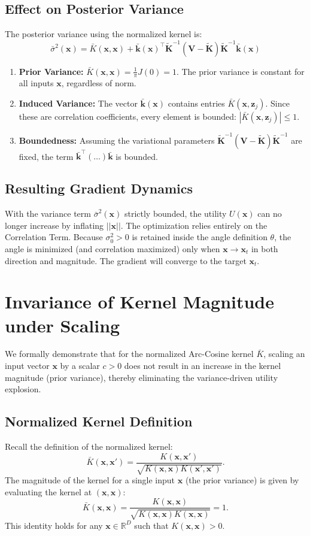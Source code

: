 \documentclass[11pt]{article}
\newcommand{\bx}{\mathbf{x}}
\newcommand{\bz}{\mathbf{z}}
\newcommand{\bk}{\mathbf{k}}
\newcommand{\bK}{\mathbf{K}}
\newcommand{\bV}{\mathbf{V}}
\begin{document}
\subsection{Effect on Posterior Variance}
The posterior variance using the normalized kernel is:
\begin{equation}
    \bar{\sigma}^2(\bx) = \bar{K}(\bx, \bx) + \bar{\bk}(\bx)^\top \tilde{\bK}^{-1} (\bV - \tilde{\bK}) \tilde{\bK}^{-1} \bar{\bk}(\bx)
\end{equation}
\begin{enumerate}
    \item \textbf{Prior Variance:} $\bar{K}(\bx, \bx) = \frac{1}{\pi} J(0) = 1$. The prior variance is constant for all inputs $\bx$, regardless of norm.
    \item \textbf{Induced Variance:} The vector $\bar{\bk}(\bx)$ contains entries $\bar{K}(\bx, \bz_j)$. Since these are correlation coefficients, every element is bounded: $|\bar{K}(\bx, \bz_j)| \leq 1$.
    \item \textbf{Boundedness:} Assuming the variational parameters $\tilde{\bK}^{-1} (\bV - \tilde{\bK}) \tilde{\bK}^{-1}$ are fixed, the term $\bar{\bk}^\top (\dots) \bar{\bk}$ is bounded.
\end{enumerate}

\subsection{Resulting Gradient Dynamics}
With the variance term $\bar{\sigma}^2(\bx)$ strictly bounded, the utility $U(\bx)$ can no longer increase by inflating $||\bx||$. The optimization relies entirely on the Correlation Term.
Because $\sigma_0^2 > 0$ is retained inside the angle definition $\theta$, the angle is minimized (and correlation maximized) only when $\bx \to \bx_t$ in both direction and magnitude. The gradient will converge to the target $\bx_t$.
\section{Invariance of Kernel Magnitude under Scaling}

We formally demonstrate that for the normalized Arc-Cosine kernel $\bar{K}$, scaling an input vector $\bx$ by a scalar $c > 0$ does not result in an increase in the kernel magnitude (prior variance), thereby eliminating the variance-driven utility explosion.

\subsection{Normalized Kernel Definition}
Recall the definition of the normalized kernel:
\begin{equation}
    \bar{K}(\bx, \bx') = \frac{K(\bx, \bx')}{\sqrt{K(\bx, \bx) K(\bx', \bx')}}.
\end{equation}
The magnitude of the kernel for a single input $\bx$ (the prior variance) is given by evaluating the kernel at $(\bx, \bx)$:
\begin{equation}
    \bar{K}(\bx, \bx) = \frac{K(\bx, \bx)}{\sqrt{K(\bx, \bx) K(\bx, \bx)}} = 1.
\end{equation}
This identity holds for any $\bx \in \mathbb{R}^D$ such that $K(\bx, \bx) > 0$.
\end{document}
